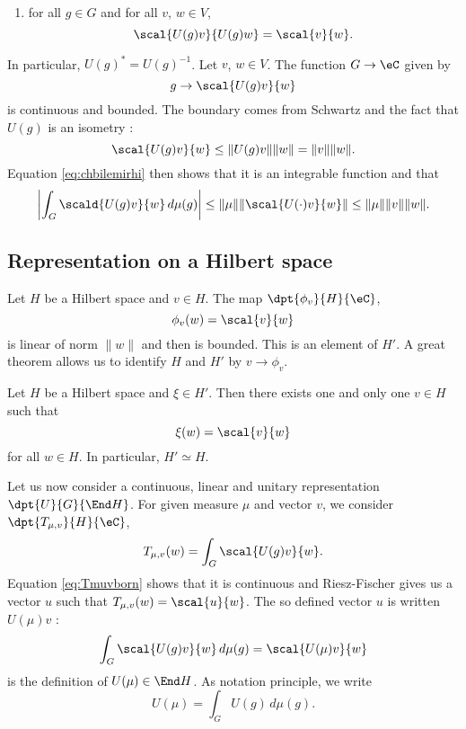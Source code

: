 \begin{enumerate}
\setcounter{enumi}{\value{bidon}}
\item  for all $g\in G$ and for all $v$, $w\in V$,
\begin{equation}
  \scal{U(g)v}{U(g)w}=\scal{v}{w}.
\end{equation}
\end{enumerate}
In particular, $U(g)^*=U(g)^{-1}$. Let $v$, $w\in V$. The function $G\to\eC$ given by
\[ 
  g\to \scal{U(g)v}{w}
\]
is continuous and bounded. The boundary comes from Schwartz and the fact that $U(g)$ is an isometry :
\begin{equation}
  \scal{U(g)v}{w}\leq \| U(g)v \|\| w \|
		=\| v \|\| w \|.
\end{equation}
Equation \eqref{eq:chbilemirhi} then shows that it is an integrable function and that
\begin{equation} \label{eq:Tmuvborn}
\left|    \int_G\scald{U(g)v}{w}\,d\mu(g)   \right|\leq\| \mu \|\| \scal{U(\cdot)v}{w} \|
						\leq \| \mu \|\| v \|\| w \|.
\end{equation}

\subsection{Representation on a Hilbert space}

Let $H$ be a Hilbert space and $v\in H$. The map $\dpt{\phi_v}{H}{\eC}$,
\[ 
  \phi_v(w)=\scal{v}{w}
\]
is linear of norm $\| w \|$ and then is bounded. This is an element of $H'$. A great theorem allows us to identify $H$ and $H'$ by $v\to\phi_v$.

\begin{theorem}
   Let $H$ be a Hilbert space and $\xi\in H'$. Then there exists one and only one $v\in H$ such that 
\[ 
  \xi(w)=\scal{v}{w}
\]
for all $w\in H$. In particular, $H'\simeq H$.
\end{theorem}

Let us now consider a continuous, linear and unitary representation $\dpt{U}{G}{\End H}$. For given measure $\mu$ and vector $v$, we consider $\dpt{T_{\mu,v}}{H}{\eC}$,
\[ 
  T_{\mu,v}(w)=\int_G\scal{U(g)v}{w}.
\]
Equation \eqref{eq:Tmuvborn} shows that it is continuous and Riesz-Fischer gives us a vector $u$ such that $T_{\mu,v}(w)=\scal{u}{w}$. The so defined vector $u$ is written $U(\mu)v$ :
\begin{equation}
   \int_G \scal{U(g)v}{w}\,d\mu(g)=\scal{U(\mu)v}{w}
\end{equation}
is the definition of $U(\mu)\in\End H$. As notation principle, we write
\[ 
  U(\mu)=\int_GU(g)\,d\mu(g).
\]

